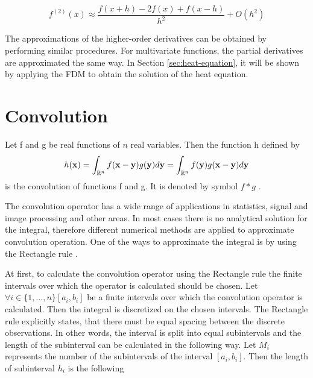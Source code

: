 \begin{equation} \label{Approx5}
 f^{(2)}(x) \approx \frac{f(x + h) - 2 f(x) + f(x - h)}{h^2} + O(h^2)
\end{equation}

The approximations of the higher-order derivatives can be obtained by performing similar procedures.
For multivariate functions, the partial derivatives are approximated the same way.
In Section \ref{sec:heat-equation}, it will be shown by applying the FDM to obtain the solution of the heat equation.

\section{Convolution}

\begin{definition}
 Let f and g be real functions of \(n\) real variables. Then the function h defined by
 \begin{equation}
 h(\mathbf{x}) = \int_{\Bbb{R}^n} f(\mathbf{x} - \mathbf{y}) g(\mathbf{y}) d\mathbf{y} = \int_{\Bbb{R}^n} f(\mathbf{y}) g(\mathbf{x} - \mathbf{y}) d\mathbf{y}
 \end{equation}
 is the convolution of functions f and g. It is denoted by symbol \(f * g\) \cite{Convolution}.
\end{definition}

The convolution operator has a wide range of applications in statistics, signal and image processing and other areas.
In most cases there is no analytical solution for the integral, therefore different numerical methods are applied to approximate convolution operation.
One of the ways to approximate the integral is by using the Rectangle rule \cite{ConvolutionTheorem}.

At first, to calculate the convolution operator using the Rectangle rule the finite intervals over which the operator is calculated should be chosen.
Let \(\forall i \in \{1, \dots, n\} [a_i, b_i]\) be a finite intervals over which the convolution operator is calculated.
Then the integral is discretized on the chosen intervals.
The Rectangle rule explicitly states, that there must be equal spacing between the discrete observations.
In other words, the interval is split into equal subintervals and the length of the subinterval can be calculated in the following way.
Let \(M_i\) represents the number of the subintervals of the interval \([a_i, b_i]\).
Then the length of subinterval \(h_i\) is the following

